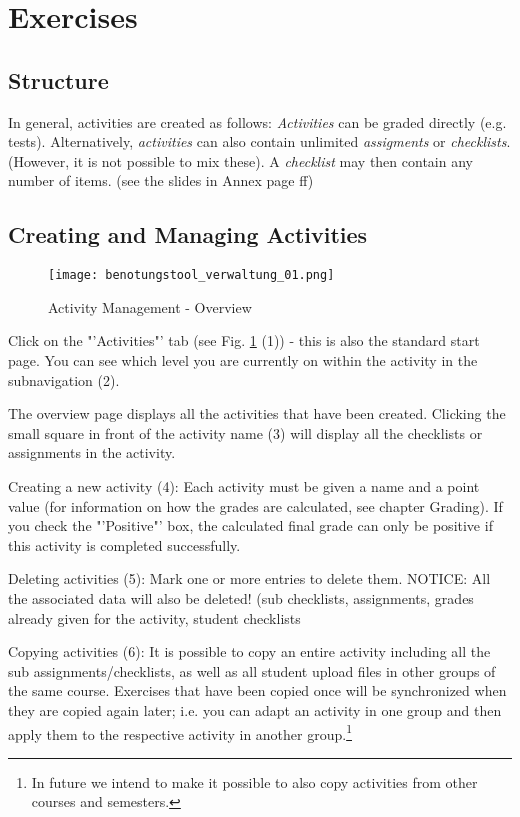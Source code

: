 \section{Exercises}
\subsection{Structure}
\noindent
In general, activities are created as follows:
{\em Activities} can be graded directly (e.g. tests).
Alternatively, {\em activities} can also contain unlimited {\em assigments} or {\em checklists}. (However, it is not possible to mix these).
A {\em checklist} may then contain any number of items.
(see the slides in Annex page \pageref{struktur}ff)

\subsection{Creating and Managing Activities}

\begin{figure}[ht]
\begin{center}

%
\texttt{[image: benotungstool\_verwaltung\_01.png]}

\end{center}
\caption{Activity Management - Overview}\label{verwaltung_01}
\end{figure}

Click on the "'Activities"' tab (see Fig. \ref{verwaltung_01} (1)) - this is also the standard start page.
You can see which level you are currently on within the activity in the subnavigation (2).

The overview page displays all the activities that have been created. 
Clicking the small square in front of the activity name (3) will display all the checklists or assignments in the activity.

Creating a new activity (4): Each activity must be given a name and a point value (for information on how the grades are calculated, see chapter Grading).
If you check the "'Positive"' box, the calculated final grade can only be positive if this activity is completed successfully.

Deleting activities (5): Mark one or more entries to delete them. NOTICE: All the associated data will also be deleted! (sub checklists, assignments, grades already given for the activity, student checklists

Copying activities (6): It is possible to copy an entire activity including all the sub assignments/checklists, as well as all student upload files in other groups of the same course.
Exercises that have been copied once will be synchronized when they are copied again later; i.e. you can adapt an activity in one group and then apply them to the respective activity in another group.\footnote{In future we intend to make it possible to also copy activities from other courses and semesters.}

